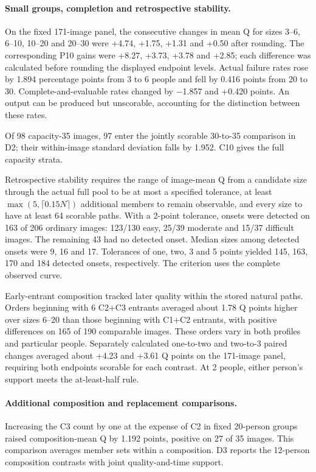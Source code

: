 \paragraph{Small groups, completion and retrospective stability.}
On the fixed 171-image panel, the consecutive changes in mean Q for sizes 3--6, 6--10, 10--20 and 20--30 were +4.74, +1.75, +1.31 and +0.50 after rounding. The corresponding P10 gains were +8.27, +3.73, +3.78 and +2.85; each difference was calculated before rounding the displayed endpoint levels. Actual failure rates rose by 1.894 percentage points from 3 to 6 people and fell by 0.416 points from 20 to 30. Complete-and-evaluable rates changed by $-$1.857 and +0.420 points. An output can be produced but unscorable, accounting for the distinction between these rates.

Of 98 capacity-35 images, 97 enter the jointly scorable 30-to-35 comparison in D2; their within-image standard deviation falls by 1.952. C10 gives the full capacity strata.

Retrospective stability requires the range of image-mean Q from a candidate size through the actual full pool to be at most a specified tolerance, at least $\max(5,\lceil0.15N\rceil)$ additional members to remain observable, and every size to have at least 64 scorable paths. With a 2-point tolerance, onsets were detected on 163 of 206 ordinary images: 123/130 easy, 25/39 moderate and 15/37 difficult images. The remaining 43 had no detected onset. Median sizes among detected onsets were 9, 16 and 17. Tolerances of one, two, 3 and 5 points yielded 145, 163, 170 and 184 detected onsets, respectively. The criterion uses the complete observed curve.

Early-entrant composition tracked later quality within the stored natural paths. Orders beginning with 6 C2+C3 entrants averaged about 1.78 Q points higher over sizes 6--20 than those beginning with C1+C2 entrants, with positive differences on 165 of 190 comparable images. These orders vary in both profiles and particular people. Separately calculated one-to-two and two-to-3 paired changes averaged about +4.23 and +3.61 Q points on the 171-image panel, requiring both endpoints scorable for each contrast. At 2 people, either person's support meets the at-least-half rule.

\paragraph{Additional composition and replacement comparisons.}
Increasing the C3 count by one at the expense of C2 in fixed 20-person groups raised composition-mean Q by 1.192 points, positive on 27 of 35 images. This comparison averages member sets within a composition. D3 reports the 12-person composition contrasts with joint quality-and-time support.

